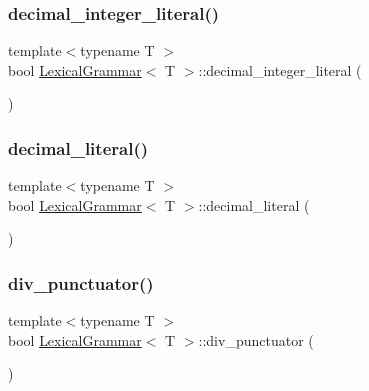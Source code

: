 \mbox{\label{class_lexical_grammar_afb8b57c8a9457981b9d99704ee78c066}} 
\subsubsection{\texorpdfstring{decimal\+\_\+integer\+\_\+literal()}{decimal\_integer\_literal()}}
{\footnotesize\ttfamily template$<$typename T $>$ \\
bool \hyperlink{class_lexical_grammar}{Lexical\+Grammar}$<$ T $>$\+::decimal\+\_\+integer\+\_\+literal (\begin{DoxyParamCaption}{ }\end{DoxyParamCaption})\hspace{0.3cm}{\ttfamily [inline]}}

\mbox{\label{class_lexical_grammar_aa4b1f1f944befbe96ee450a0399e85df}} 
\subsubsection{\texorpdfstring{decimal\+\_\+literal()}{decimal\_literal()}}
{\footnotesize\ttfamily template$<$typename T $>$ \\
bool \hyperlink{class_lexical_grammar}{Lexical\+Grammar}$<$ T $>$\+::decimal\+\_\+literal (\begin{DoxyParamCaption}{ }\end{DoxyParamCaption})\hspace{0.3cm}{\ttfamily [inline]}}

\mbox{\label{class_lexical_grammar_a37ea4db956749e0519e34ec8e304d2fb}} 
\subsubsection{\texorpdfstring{div\+\_\+punctuator()}{div\_punctuator()}}
{\footnotesize\ttfamily template$<$typename T $>$ \\
bool \hyperlink{class_lexical_grammar}{Lexical\+Grammar}$<$ T $>$\+::div\+\_\+punctuator (\begin{DoxyParamCaption}{ }\end{DoxyParamCaption})\hspace{0.3cm}{\ttfamily [inline]}}

